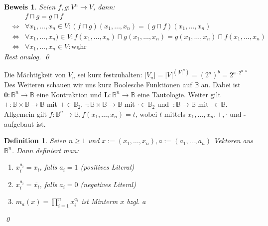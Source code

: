 \documentclass[ngerman]{scrartcl}
\theoremstyle{custom}
\newtheorem{mdef}{Definition} \numberwithin{mdef}{subsection}
\newtheorem*{bw}{Beweis}
\newcommand{\0}{\mathbf{0}}
\newcommand{\1}{\mathbf{L}}
\begin{document}
\begin{bw}
Seien $f,g:V^n \rightarrow V$, dann:
\begin{eqnarray*}
&&f \sqcap g = g \sqcap f \\
&\Leftrightarrow& \forall x_1, \dots, x_n \in V: (f \sqcap g)(x_1,
\dots, x_n) = (g \sqcap f)(x_1, \dots, x_n)\\
&\Leftrightarrow& \forall x_1, \dots, x_n) \in V: f (x_1, \dots, x_
n) \sqcap g (x_1, \dots, x_n) = g (x_1, \dots, x_n) \sqcap f(x_1,
\dots, x_n)\\
&\Leftrightarrow& \forall x_1, \dots, x_n \in V:
\underline{\text{wahr}}
\end{eqnarray*}
Rest analog.
\qed
\end{bw}
Die M\"achtigkeit von $V_n$ sei kurz festzuhalten: $\vert V_n \vert =
\vert V\vert^{(\vert V\vert^n)} = (2^a)^b = 2^{a\cdot 2^{a\cdot n}}$\\

Des Weiteren schauen wir uns kurz Boolesche Funktionen auf
$\mathds{B}$ an. Dabei ist $\0: \mathds{B}^n \rightarrow \mathds{B}$
eine Kontraktion und $\1: \mathds{B}^n \rightarrow \mathds{B}$ eine
Tautologie. Weiter gilt $+: \mathds{B} \times \mathds{B} \rightarrow
\mathds{B}$ mit $+ \in \mathds{B}_2$, $\cdot: \mathds{B} \times \mathds{B} \rightarrow
\mathds{B}$ mit $\cdot \in \mathds{B}_2$ und $\bar~: \mathds{B} \rightarrow
\mathds{B}$ mit $\bar~ \in \mathds{B}$. Allgemein gilt $f:
\mathds{B}^n \rightarrow \mathds{B}, f(x_1, \dots, x_n) = t$, wobei
$t$ mittels $x_1, \dots, x_n, +, \cdot$ und $\bar~$ aufgebaut ist.

\begin{mdef}
Seien $n \geq 1$ und $x:=(x_1, \dots, x_n), a:= (a_1, \dots, a_n)$
Vektoren aus $\mathds{B}^n$. Dann definiert man:
\begin{enumerate}
\item $x_i^{a_i} = x_i$, falls $a_i = 1$ (positives Literal)
\item $x_i^{a_i} = \overline{x_i}$, falls $a_i = 0$ (negatives
  Literal)
\item $m_a(x) = \prod_{i=1}^{n} x_i^{a_i}$ ist Minterm $x$ bzgl. $a$
\end{enumerate}
\qed
\end{mdef}
\end{document}
